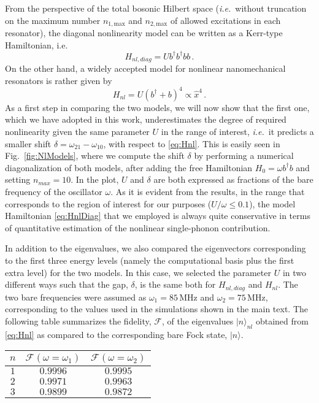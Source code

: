 \documentclass[aps,twocolumn,groupedaddress,superscriptaddress,floatfix,amsmath,amssymb,prb]{revtex4-1}
\begin{document}
From the perspective of the total bosonic Hilbert space (\textit{i.e.}\ without truncation on the maximum number $n_{1,\mathrm{max}}$ and $n_{2,\mathrm{max}}$ of allowed excitations in each resonator), the diagonal nonlinearity model can be written as a Kerr-type Hamiltonian, i.e.
\begin{equation}
H_{nl,diag} = U b^\dagger b^\dagger b b \, .
\label{eq:HnlDiag}
\end{equation}
On the other hand, a widely accepted model for nonlinear nanomechanical resonators is rather given by 
\begin{equation}
H_{nl} = U (b^\dagger+b)^4 \propto \hat{x}^4 \, .
\label{eq:Hnl}
\end{equation}
As a first step in comparing the two models, we will now show that the first one, which we have adopted in this work, underestimates the degree of required nonlinearity given the same parameter $U$ in the range of interest, \textit{i.e.}\ it predicts a smaller shift $\delta = \omega_{21}-\omega_{10}$, with respect to \eqref{eq:Hnl}. This is easily seen in Fig.~\ref{fig:NlModels}, where we compute the shift $\delta$ by performing a numerical diagonalization of both models, after adding the free Hamiltonian $H_0 = \omega b^\dagger b$ and setting $n_{max} = 10$. In the plot, $U$ and $\delta$ are both expressed as fractions of the bare frequency of the oscillator $\omega$. As it is evident from the results, in the range that corresponds to the region of interest for our purposes ($U/\omega \leq 0.1$), the model Hamiltonian \eqref{eq:HnlDiag} that we employed is always quite conservative in terms of quantitative estimation of the nonlinear single-phonon contribution.

In addition to the eigenvalues, we also compared the eigenvectors corresponding to the first three energy levels (namely the computational basis plus the first extra level) for the two models. In this case, we selected the parameter $U$ in two different ways such that the gap, $\delta$, is the same both for $H_{nl,diag}$ and $H_{nl}$. 
The two bare frequencies were assumed as $\omega_1  = 85\,$MHz and $\omega_2  = 75\,$MHz, corresponding to the values used in the simulations shown in the main text. The following table summarizes the fidelity, $\mathcal{F}$, of the eigenvalues $|n\rangle_{nl}$ obtained from \eqref{eq:Hnl} as compared to the corresponding bare Fock state, $|n\rangle$.

\begin{table}[!h]
\centering
\begin{tabular}{|c|c|c|}
\hline
$n$ & $\mathcal{F}(\omega = \omega_1)$ & $\mathcal{F}(\omega = \omega_2)$ \\ 
\hline
$1$ & $0.9996$ & $0.9995$ \\ 
$2$ & $0.9971$ & $0.9963$ \\ 
$3$ & $0.9899$ & $0.9872$ \\ 
\hline
\end{tabular}
\end{table}
\end{document}
